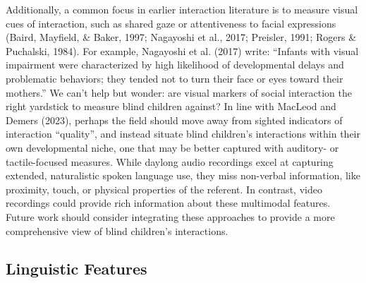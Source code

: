 \documentclass[
  man,floatsintext]{apa6}
\begin{document}
Additionally, a common focus in earlier interaction literature is to measure visual cues of interaction, such as shared gaze or attentiveness to facial expressions (Baird, Mayfield, \& Baker, 1997; Nagayoshi et al., 2017; Preisler, 1991; Rogers \& Puchalski, 1984). For example, Nagayoshi et al. (2017) write: ``Infants with visual impairment were characterized by high likelihood of developmental delays and problematic behaviors; they tended not to turn their face or eyes toward their mothers.'' We can't help but wonder: are visual markers of social interaction the right yardstick to measure blind children against? In line with MacLeod and Demers (2023), perhaps the field should move away from sighted indicators of interaction ``quality'', and instead situate blind children's interactions within their own developmental niche, one that may be better captured with auditory- or tactile-focused measures. While daylong audio recordings excel at capturing extended, naturalistic spoken language use, they miss non-verbal information, like proximity, touch, or physical properties of the referent. In contrast, video recordings could provide rich information about these multimodal features. Future work should consider integrating these approaches to provide a more comprehensive view of blind children's interactions.

\hypertarget{linguistic-features-2}{%
\subsection{Linguistic Features}\label{linguistic-features-2}}
\end{document}
